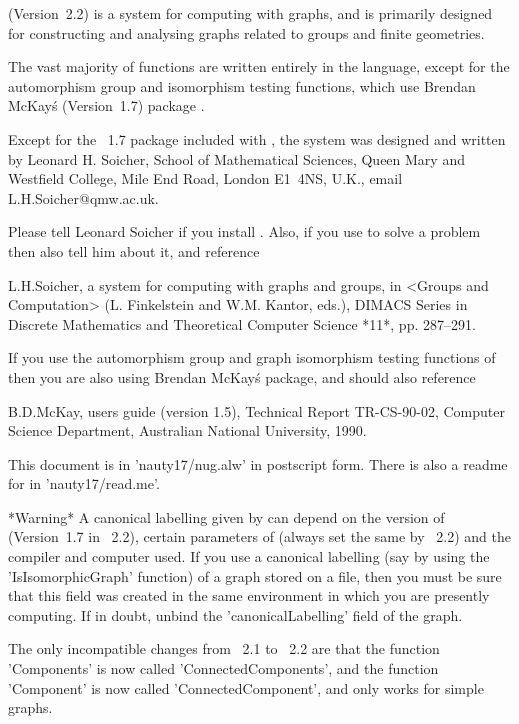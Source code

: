 
{\GRAPE}  (Version~2.2)  is  a system for  computing with graphs,  and is
primarily  designed  for constructing  and analysing  graphs  related  to
groups and finite geometries.

The vast  majority  of {\GRAPE}  functions  are written entirely  in  the
{\GAP}  language,  except  for  the  automorphism  group  and isomorphism
testing  functions,  which use  Brendan  McKay\'s  {\nauty} (Version~1.7)
package \cite{Nau90}.

Except for the {\nauty}~1.7 package included with  {\GRAPE}, the {\GRAPE}
system  was designed  and  written by Leonard   H.   Soicher,  School  of
Mathematical Sciences, Queen Mary  and Westfield College,  Mile End Road,
London E1~4NS, U.K., email\: L.H.Soicher@qmw.ac.uk.

Please tell Leonard  Soicher if  you install  {\GRAPE}.  Also, if you use
{\GRAPE} to solve a problem then also tell him about it, and reference

L.H.Soicher, {\GRAPE\:} a system for computing with graphs and groups, in
<Groups and Computation>  (L. Finkelstein and W.M. Kantor, eds.),  DIMACS 
Series  in Discrete  Mathematics and  Theoretical Computer Science  *11*, 
pp. 287--291.

If you use the automorphism group and graph isomorphism testing functions
of {\GRAPE} then you  are  also using Brendan McKay\'s  {\nauty} package,
and should also reference

B.D.McKay,   {\nauty}  users  guide  (version   1.5),  Technical   Report
TR-CS-90-02, Computer Science Department, Australian National University,
1990.

This document is in 'nauty17/nug.alw' in  postscript form.  There is also
a readme for {\nauty} in 'nauty17/read.me'.

*Warning*  A canonical  labelling  given  by  {\nauty} can  depend on the
version of  {\nauty}  (Version~1.7 in  {\GRAPE}~2.2),  certain parameters
of {\nauty} (always set  the  same  by {\GRAPE}~2.2) and the compiler and 
computer used.  If  you  use  a  canonical labelling  (say by  using  the 
'IsIsomorphicGraph' function) of  a graph stored on a file, then you must  
be sure that this field  was created in the same environment in which you 
are  presently  computing.  If in doubt, unbind the  'canonicalLabelling' 
field of the graph.

The only incompatible changes from {\GRAPE}~2.1 to {\GRAPE}~2.2 are  that 
the function 'Components' is  now  called 'ConnectedComponents',  and the 
function  'Component'  is now called 'ConnectedComponent', and only works
for simple graphs.

